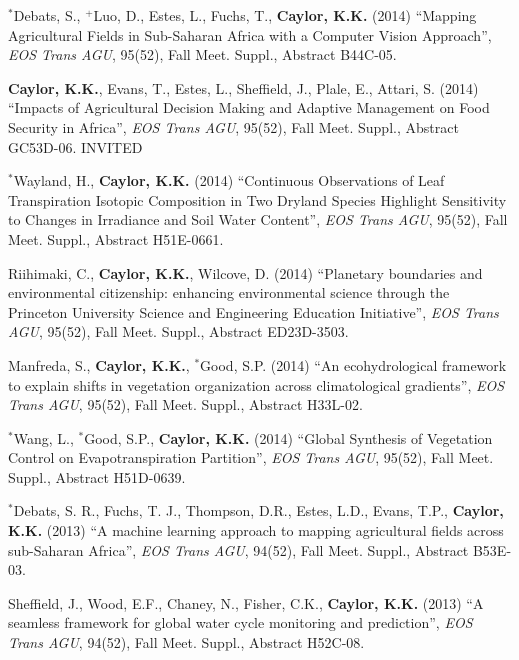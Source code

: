 \documentclass[10pt]{article}
\begin{document}
\begin{etaremune}
\item $^{*}$Debats, S., $^{+}$Luo, D., Estes, L., Fuchs, T.,  \textbf{Caylor, K.K.} (2014) ``Mapping Agricultural Fields in Sub-Saharan Africa with a Computer Vision Approach'', \emph{EOS Trans AGU}, 95(52), Fall Meet. Suppl., Abstract  B44C-05. 

\item \textbf{Caylor, K.K.}, Evans, T.,  Estes, L.,  Sheffield, J., Plale, E.,  Attari, S. (2014) ``Impacts of Agricultural Decision Making and Adaptive Management on Food Security in Africa'',  \emph{EOS Trans AGU}, 95(52), Fall Meet. Suppl., Abstract GC53D-06. INVITED

\item $^{*}$Wayland, H., \textbf{Caylor, K.K.} (2014) ``Continuous Observations of Leaf Transpiration Isotopic Composition in Two Dryland Species Highlight Sensitivity to Changes in Irradiance and Soil Water Content'',  \emph{EOS Trans AGU}, 95(52), Fall Meet. Suppl., Abstract  H51E-0661.

\item  Riihimaki, C., \textbf{Caylor, K.K.}, Wilcove, D. (2014) ``Planetary boundaries and environmental citizenship: enhancing environmental science through the Princeton University Science and Engineering Education Initiative'',  \emph{EOS Trans AGU}, 95(52), Fall Meet. Suppl., Abstract  ED23D-3503.

\item Manfreda, S., \textbf{Caylor, K.K.}, $^{*}$Good, S.P. (2014) ``An ecohydrological framework to explain shifts in vegetation organization across climatological gradients'', \emph{EOS Trans AGU}, 95(52), Fall Meet. Suppl., Abstract H33L-02.

\item $^{*}$Wang, L., $^{*}$Good, S.P., \textbf{Caylor, K.K.} (2014) ``Global Synthesis of Vegetation Control on Evapotranspiration Partition'',  \emph{EOS Trans AGU}, 95(52), Fall Meet. Suppl., Abstract H51D-0639.

\item $^{*}$Debats, S. R., Fuchs, T. J., Thompson, D.R., Estes, L.D., Evans, T.P., \textbf{Caylor, K.K.} (2013) ``A machine learning approach to mapping agricultural fields across sub-Saharan Africa'', \emph{EOS Trans AGU}, 94(52), Fall Meet. Suppl., Abstract B53E-03. 

\item Sheffield, J., Wood, E.F., Chaney, N., Fisher, C.K., \textbf{Caylor, K.K.} (2013) ``A seamless  framework for global water cycle monitoring and prediction'', \emph{EOS Trans AGU}, 94(52), Fall Meet. Suppl., Abstract H52C-08.


\end{etaremune}
\end{document}
